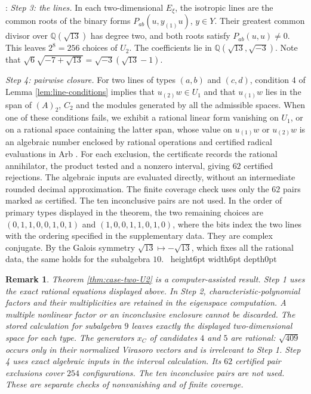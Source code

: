 \documentclass[leqno]{article}
\newcommand{\qed}{\hfill \vrule height6pt  width6pt depth0pt}
\newtheorem{remark}[thm]{Remark}
\newenvironment{proof}[1][]{\noindent {\it Proof #1} : }{\hbox{~}\qed
\smallskip
}
\numberwithin{equation}{section}
\begin{document}
\begin{proof}
\emph{Step 3: the lines.} In each two-dimensional $E_\xi$, the isotropic lines are the common roots of the binary forms $P_{ab}(u,y_{(1)}u)$, $y \in Y$. Their greatest common divisor over $\mathbb{Q}(\sqrt{13})$ has degree two, and both roots satisfy $P_{ab}(u,u) \neq 0$. This leaves $2^8 = 256$ choices of $U_2$. The coefficients lie in $\mathbb{Q}(\sqrt{13},\sqrt{-3})$. Note that $\sqrt 6\sqrt{-7+\sqrt{13}} = \sqrt{-3}(\sqrt{13}-1)$.

\emph{Step 4: pairwise closure.} For two lines of types $(a,b)$ and $(c,d)$, condition 4 of Lemma \ref{lem:line-conditions} implies that $u_{(2)}w \in U_1$ and that $u_{(1)}w$ lies in the span of $(A)_2$, $C_2$ and the modules generated by all the admissible spaces. When one of these conditions fails, we exhibit a rational linear form vanishing on $U_1$, or on a rational space containing the latter span, whose value on $u_{(1)}w$ or $u_{(2)}w$ is an algebraic number enclosed by rational operations and certified radical evaluations in Arb \cite{Joh17}. For each exclusion, the certificate records the rational annihilator, the product tested and a nonzero interval, giving $62$ certified rejections. The algebraic inputs are evaluated directly, without an intermediate rounded decimal approximation. The finite coverage check uses only the $62$ pairs marked as certified. The ten inconclusive pairs are not used. In the order of primary types displayed in the theorem, the two remaining choices are $(0,1,1,0,0,1,0,1)$ and $(1,0,0,1,1,0,1,0)$, where the bits index the two lines with the ordering specified in the supplementary data. They are complex conjugate. By the Galois symmetry $\sqrt{13} \mapsto -\sqrt{13}$, which fixes all the rational data, the same holds for the subalgebra $10$.
\end{proof}

\begin{remark}\normalfont
\label{rem:case-two-status}
Theorem \ref{thm:case-two-U2} is a computer-assisted result. Step 1 uses the exact rational equations displayed above. In Step 2, characteristic-polynomial factors and their multiplicities are retained in the eigenspace computation. A multiple nonlinear factor or an inconclusive enclosure cannot be discarded. The stored calculation for subalgebra $9$ leaves exactly the displayed two-dimensional space for each type. The generators $x_C$ of candidates $4$ and $5$ are rational: $\sqrt{409}$ occurs only in their normalized Virasoro vectors and is irrelevant to Step 1. Step 4 uses exact algebraic inputs in the interval calculation. Its $62$ certified pair exclusions cover $254$ configurations. The ten inconclusive pairs are not used. These are separate checks of nonvanishing and of finite coverage.
\end{remark}
\end{document}
